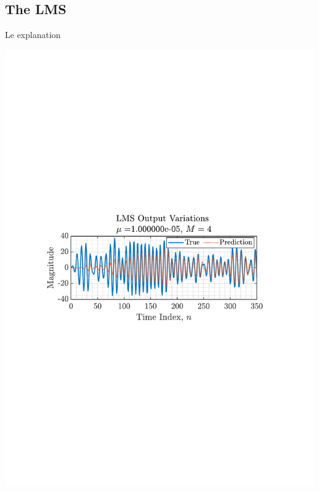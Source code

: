 \documentclass[12pt]{article}
\begin{document}
	\subsection{The LMS} \label{sec: 4-1-LMS}
		\begin{minipage}[b]{0.49\textwidth}
			Le explanation
		\end{minipage}%
		\begin{minipage}{0.04\textwidth}
			\hspace*{0.04\textwidth}
		\end{minipage}%
		\begin{minipage}{0.49\textwidth}
			\centering
			\includegraphics[trim={2.2cm 11.2cm 3.15cm  11.2cm}, clip, width=\textwidth]{../MATLAB/figures/q4_1_fig01.pdf} 
			
			\captionsetup{justification=centering}
			\label{fig: 4-1}
		\end{minipage}%
\end{document}
